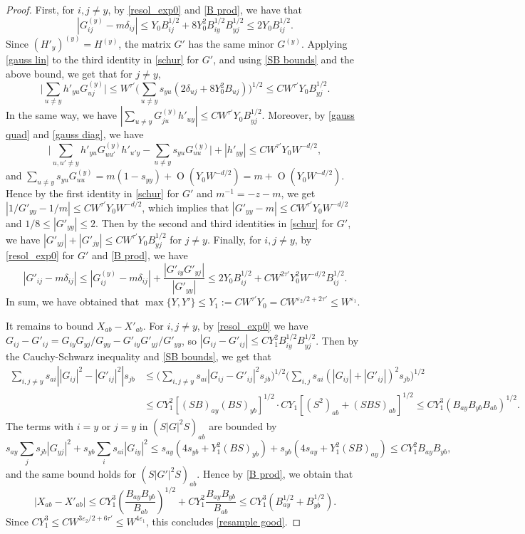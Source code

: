 \documentclass{article}
\newcommand{\1}{\mathds{1}}
\numberwithin{equation}{section}
\newcommand{\e}{{\varepsilon}}
\renewcommand{\leq}{\leqslant}
\renewcommand{\le}{\leq}
\DeclareMathOperator{\OO}{O}
\theoremstyle{plain} %
\theoremstyle{remark}
\begin{document}
\begin{proof}
First, for $i,j\ne y$, by \eqref{resol_exp0} and \eqref{B prod}, we have that
$$|G^{(y)}_{ij}-m\delta_{ij}|\le Y_0B_{ij}^{1/2}+8Y_0^2B^{1/2}_{iy}B^{1/2}_{yj}\le 2Y_0B_{ij}^{1/2}.$$
Since $(H'_y)^{(y)}=H^{(y)}$, the matrix $G'$ has the same minor $G^{(y)}$. Applying \eqref{gauss lin} to the third identity in \eqref{schur} for $G'$, and using \eqref{SB bounds} and the above bound, we get that for $j\ne y$,
$$\Big|\sum_{u\ne y}h'_{yu}G^{(y)}_{uj}\Big|\le W^{\tau'}\Big(\sum_{u\ne y}s_{yu}\left(2\delta_{uj}+8Y_0^2B_{uj}\right)\Big)^{1/2}\le CW^{\tau'}Y_0B_{yj}^{1/2}.$$
In the same way, we have $|\sum_{u\ne y}G^{(y)}_{ju}h'_{uy}|\le CW^{\tau'}Y_0B_{yj}^{1/2}$. Moreover, by \eqref{gauss quad} and \eqref{gauss diag}, we have
$$\Big|\sum_{u,u'\ne y}h'_{yu}G^{(y)}_{uu'}h'_{u'y}-\sum_{u\ne y}s_{yu}G^{(y)}_{uu}\Big|+|h'_{yy}|\le CW^{\tau'}Y_0W^{-d/2},$$
and $\sum_{u\ne y}s_{yu}G^{(y)}_{uu}=m(1-s_{yy})+\OO(Y_0W^{-d/2})=m+\OO(Y_0W^{-d/2})$. Hence by the first identity in \eqref{schur} for $G'$ and $m^{-1}=-z-m$, we get $|1/G'_{yy}-1/m|\le CW^{\tau'}Y_0W^{-d/2}$, which implies that $|G'_{yy}-m|\le CW^{\tau'}Y_0W^{-d/2}$ and $1/8\le |G'_{yy}|\le 2$. Then by the second and third identities in \eqref{schur} for $G'$, we have $|G'_{yj}|+|G'_{jy}|\le CW^{\tau'}Y_0B^{1/2}_{yj}$ for $j\ne y$. Finally, for $i,j\ne y$, by \eqref{resol_exp0} for $G'$ and \eqref{B prod}, we have
$$|G'_{ij}-m\delta_{ij}|\le |G^{(y)}_{ij}-m\delta_{ij}|+\frac{|G'_{iy}G'_{yj}|}{|G'_{yy}|}\le 2Y_0B_{ij}^{1/2}+CW^{2\tau'}Y_0^2W^{-d/2}B_{ij}^{1/2}.$$
In sum, we have obtained that $\max\{Y,Y'\}\le Y_1:=CW^{\tau'}Y_0=CW^{\e_2/2+2\tau'}\le W^{\e_1}$.

It remains to bound $X_{ab}-X'_{ab}$. For $i,j\ne y$, by \eqref{resol_exp0} we have $G_{ij}-G'_{ij}=G_{iy}G_{yj}/G_{yy}-G'_{iy}G'_{yj}/G'_{yy}$, so $|G_{ij}-G'_{ij}|\le CY_1^2B^{1/2}_{iy}B^{1/2}_{yj}$. Then by the Cauchy-Schwarz inequality and \eqref{SB bounds}, we get that
\begin{align*}
\sum_{i,j\ne y}s_{ai}\left||G_{ij}|^2-|G'_{ij}|^2\right|s_{jb}&\le \Big(\sum_{i,j\ne y}s_{ai}|G_{ij}-G'_{ij}|^2s_{jb}\Big)^{1/2}\Big(\sum_{i,j}s_{ai}\left(|G_{ij}|+|G'_{ij}|\right)^2s_{jb}\Big)^{1/2}\\
&\le CY_1^2\left[(SB)_{ay}(BS)_{yb}\right]^{1/2}\cdot CY_1\left[(S^2)_{ab}+(SBS)_{ab}\right]^{1/2}\le CY_1^3\left(B_{ay}B_{yb}B_{ab}\right)^{1/2}.
\end{align*}
The terms with $i=y$ or $j=y$ in $(S|G|^2S)_{ab}$ are bounded by
$$s_{ay}\sum_js_{jb}|G_{yj}|^2+s_{yb}\sum_is_{ai}|G_{iy}|^2\le s_{ay}\left(4s_{yb}+Y_1^2(BS)_{yb}\right)+s_{yb}\left(4s_{ay}+Y_1^2(SB)_{ay}\right)\le CY_1^2B_{ay}B_{yb},$$
and the same bound holds for $(S|G'|^2S)_{ab}$. Hence by \eqref{B prod}, we obtain that
$$|X_{ab}-X'_{ab}|\le CY_1^3\left(\frac{B_{ay}B_{yb}}{B_{ab}}\right)^{1/2}+CY_1^2\frac{B_{ay}B_{yb}}{B_{ab}}\le CY_1^3\left(B_{ay}^{1/2}+B_{yb}^{1/2}\right).$$
Since $CY_1^3\le C W^{3\e_2/2+6\tau'}\le W^{4\e_1}$, this concludes \eqref{resample good}.
\end{proof}
\end{document}
